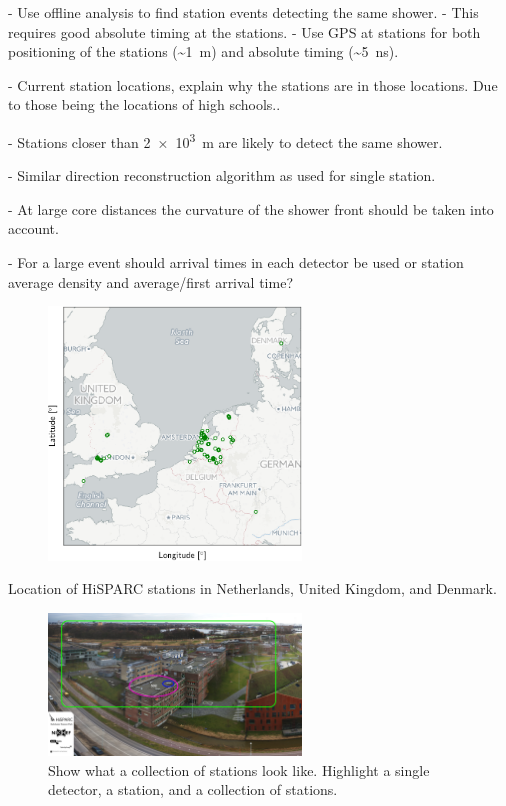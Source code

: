 - Use offline analysis to find station events detecting the same shower.
    - This requires good absolute timing at the stations.
    - Use GPS at stations for both positioning of the stations (\SI{~1}{\meter}) and absolute timing (\SI{~5}{\ns}).

- Current station locations, explain why the stations are in those locations. Due to those being the locations of high schools..

- Stations closer than \SI{2e3}{\meter} are likely to detect the same shower.

- Similar direction reconstruction algorithm as used for single station.

- At large core distances the curvature of the shower front should be taken into account.

- For a large event should arrival times in each detector be used or station average density and average/first arrival time?

\begin{figure}
    \centering
    \includegraphics[width=0.6\textwidth]
                    {plots/experiment/network}
    \caption{}
    \label{fig:network}
\end{figure}
Location of HiSPARC stations in Netherlands, United Kingdom, and Denmark.

\begin{figure}
    \centering
    \includegraphics[width=0.6\textwidth]
                    {plots/experiment/ADL_151373_151429_layers.jpg}
    \caption{Show what a collection of stations look like. Highlight a single detector, a station, and a collection of stations.}
    \label{fig:ADL_151373_151429_layers}
\end{figure}



